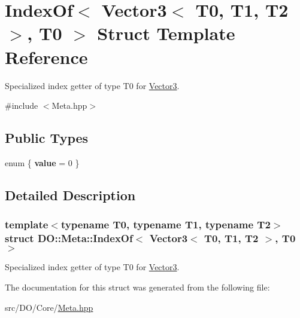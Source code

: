 \hypertarget{struct_d_o_1_1_meta_1_1_index_of_3_01_vector3_3_01_t0_00_01_t1_00_01_t2_01_4_00_01_t0_01_4}{\section{Index\-Of$<$ Vector3$<$ T0, T1, T2 $>$, T0 $>$ Struct Template Reference}
\label{struct_d_o_1_1_meta_1_1_index_of_3_01_vector3_3_01_t0_00_01_t1_00_01_t2_01_4_00_01_t0_01_4}
}


Specialized index getter of type T0 for \hyperlink{struct_d_o_1_1_meta_1_1_vector3}{Vector3}.  




{\ttfamily \#include $<$Meta.\-hpp$>$}

\subsection*{Public Types}
\begin{DoxyCompactItemize}
\item 
enum \{ {\bfseries value} = 0
 \}
\end{DoxyCompactItemize}


\subsection{Detailed Description}
\subsubsection*{template$<$typename T0, typename T1, typename T2$>$struct D\-O\-::\-Meta\-::\-Index\-Of$<$ Vector3$<$ T0, T1, T2 $>$, T0 $>$}

Specialized index getter of type T0 for \hyperlink{struct_d_o_1_1_meta_1_1_vector3}{Vector3}. 

The documentation for this struct was generated from the following file\-:\begin{DoxyCompactItemize}
\item 
src/\-D\-O/\-Core/\hyperlink{_meta_8hpp}{Meta.\-hpp}\end{DoxyCompactItemize}
